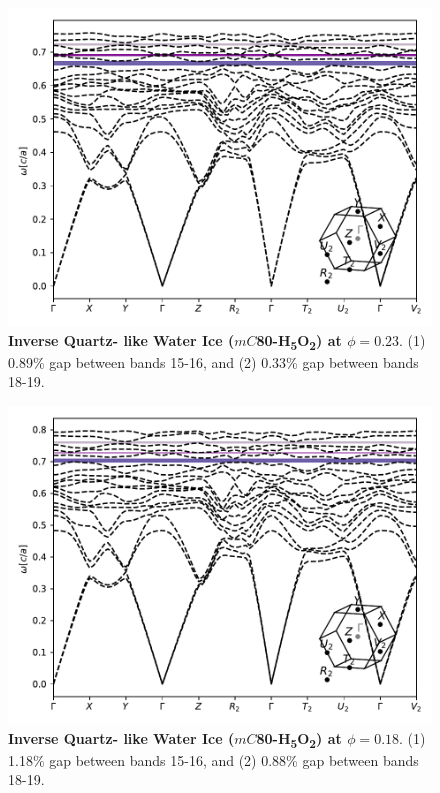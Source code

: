 \documentclass[fleqn,amsmath,amssymb,superscriptaddress, reprint,prl]{revtex4-1}
\begin{document}
\begin{figure}
\includegraphics[width=0.9\linewidth]{workspace/2af0e3f0468770593d3021d8689c33e7/images/r=21.pdf}
	\caption{\textbf{Inverse Quartz- like Water Ice ($mC$80-H\textsubscript{5}O\textsubscript{2}) at $\phi=0.23$}. (1) 0.89\% gap between bands 15-16, and (2) 0.33\% gap between bands 18-19.}
\end{figure}

\begin{figure}
\includegraphics[width=0.9\linewidth]{workspace/2af0e3f0468770593d3021d8689c33e7/images/r=22.pdf}
	\caption{\textbf{Inverse Quartz- like Water Ice ($mC$80-H\textsubscript{5}O\textsubscript{2}) at $\phi=0.18$}. (1) 1.18\% gap between bands 15-16, and (2) 0.88\% gap between bands 18-19.}
\end{figure}
\end{document}

